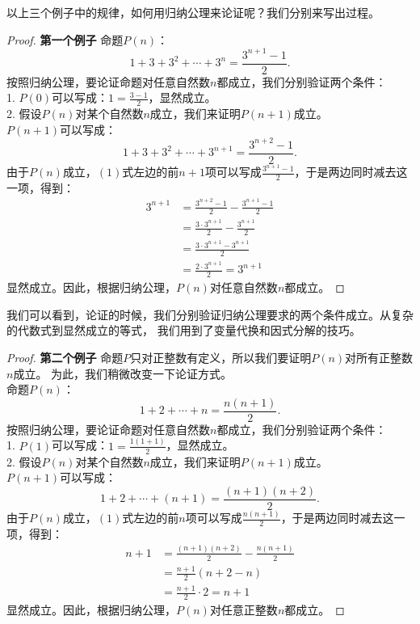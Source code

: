 \documentclass[12pt,UTF8,fontset=none]{ctexbook}
\begin{document}
以上三个例子中的规律，如何用归纳公理来论证呢？我们分别来写出过程。
\begin{proof}{\textbf{第一个例子 }}
    命题$P(n)$：
    $$ 1 + 3 + 3^2 + \cdots + 3^n = \frac{3^{n+1} - 1}{2}. $$
    按照归纳公理，要论证命题对任意自然数$n$都成立，我们分别验证两个条件：\\
    1. $P(0)$可以写成：$1 = \frac{3 - 1}{2}$，显然成立。\\
    2. 假设$P(n)$对某个自然数$n$成立，我们来证明$P(n+1)$成立。\\
    $P(n+1)$可以写成：
    $$ 1 + 3 + 3^2 + \cdots + 3^{n+1} = \frac{3^{n+2} - 1}{2}. $$
    由于$P(n)$成立，$(1)$式左边的前$n+1$项可以写成$\frac{3^{n+1} - 1}{2}$，于是两边同时减去这一项，得到：
    \begin{align*}
        3^{n+1} &= \frac{3^{n+2} - 1}{2} - \frac{3^{n+1} - 1}{2}  \\
        &= \frac{3\cdot 3^{n+1}}{2} - \frac{3^{n+1}}{2}  \\
        &= \frac{3\cdot 3^{n+1} - 3^{n+1}}{2}  \\
        &= \frac{2 \cdot 3^{n+1}}{2} = 3^{n+1} 
    \end{align*}
    显然成立。因此，根据归纳公理，$P(n)$对任意自然数$n$都成立。    
\end{proof}

我们可以看到，论证的时候，我们分别验证归纳公理要求的两个条件成立。从复杂的代数式到显然成立的等式，
我们用到了变量代换和因式分解的技巧。

\begin{proof}{\textbf{第二个例子 }}
    命题$P$只对正整数有定义，所以我们要证明$P(n)$对所有正整数$n$成立。
    为此，我们稍微改变一下论证方式。\\
    命题$P(n)$：
    $$ 1 + 2 + \cdots + n = \frac{n(n+1)}{2}. $$
    按照归纳公理，要论证命题对任意自然数$n$都成立，我们分别验证两个条件：\\
    1. $P(1)$可以写成：$1 = \frac{1(1+1)}{2}$，显然成立。\\
    2. 假设$P(n)$对某个自然数$n$成立，我们来证明$P(n+1)$成立。\\
    $P(n+1)$可以写成：
    $$ 1 + 2 + \cdots + (n+1) = \frac{(n+1)(n+2)}{2}.  $$
    由于$P(n)$成立，$(1)$式左边的前$n$项可以写成$\frac{n(n+1)}{2}$，于是两边同时减去这一项，得到：
    \begin{align*}
        n+1 &= \frac{(n+1)(n+2)}{2} - \frac{n(n+1)}{2}  \\
        &= \frac{n+1}{2}\left(n+2 - n\right)  \\
        &= \frac{n+1}{2} \cdot 2 = n+1 
    \end{align*}
    显然成立。因此，根据归纳公理，$P(n)$对任意正整数$n$都成立。    
\end{proof}
\end{document}
